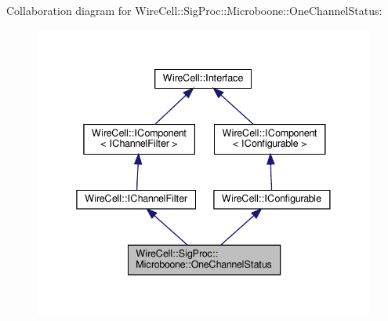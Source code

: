 Collaboration diagram for Wire\+Cell\+:\+:Sig\+Proc\+:\+:Microboone\+:\+:One\+Channel\+Status\+:
\nopagebreak
\begin{figure}[H]
\begin{center}
\leavevmode
\includegraphics[width=338pt]{class_wire_cell_1_1_sig_proc_1_1_microboone_1_1_one_channel_status__coll__graph}
\end{center}
\end{figure}
